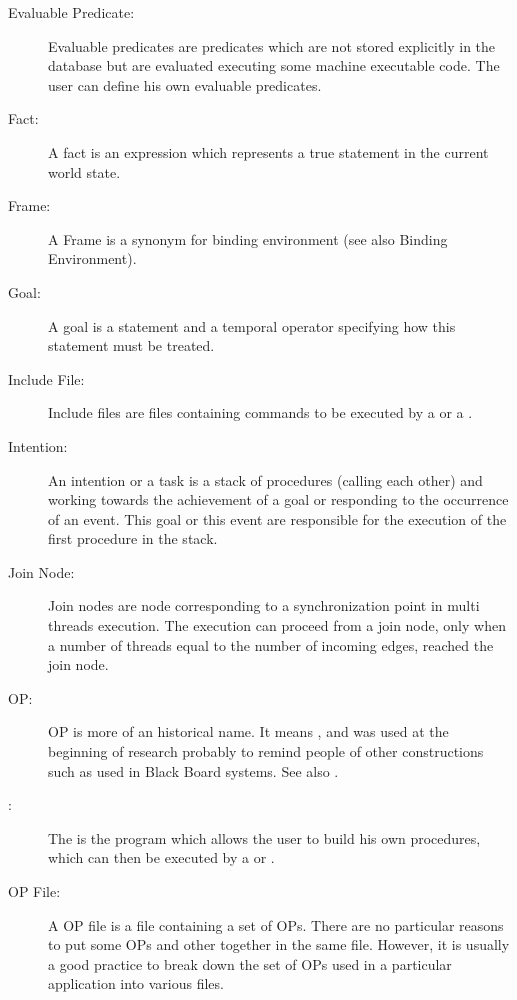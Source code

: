\begin{description}
\item[Evaluable Predicate:] Evaluable predicates are predicates which are not
stored explicitly in the database but are evaluated executing some machine
executable code. The user can define his own evaluable predicates.

\item[Fact:] A fact is an expression which represents a true statement in the
current world state.

\item[Frame:] A Frame is a synonym for binding environment (see also Binding
Environment).

\item[Goal:] A goal is a statement and a temporal operator specifying how this
statement must be treated.

\item[Include File:] Include files are files containing commands to be executed
by a \CPK{} or a \XPK{}.

\item[Intention:] An intention or a task is a stack of procedures (calling each
other) and working towards the achievement of a goal or responding to the
occurrence of an event. This goal or this event are responsible for the
execution of the first procedure in the stack.

\item[Join Node:] Join nodes are node corresponding to a synchronization point
in multi threads execution. The execution can proceed from a join node, only
when a number of threads equal to the number of incoming edges, reached the
join node.

\item[OP:] OP is more of an historical name. It means , and was used at the beginning of \OPRS{} research probably to
remind people of other  constructions such as  used in Black Board systems. See also .

\item[\OPE{}:] The \OPE{} is the program which allows the user to build
his own procedures, which can then be executed by a \XPK{} or \CPK{}.

\item[OP File:] A OP file is a file containing a set of OPs. There are no
particular reasons to put some OPs and other together in the same file.
However, it is usually a good practice to break down the set of OPs used in a
particular application into various files.


\end{description}
